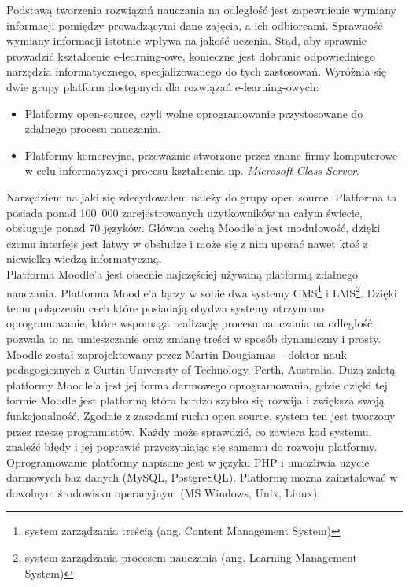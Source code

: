 \hspace{1cm}Podstawą tworzenia rozwiązań nauczania na odległość jest zapewnienie wymiany informacji pomiędzy prowadzącymi dane zajęcia, a ich odbiorcami. Sprawność wymiany informacji istotnie wpływa na jakość uczenia. Stąd, aby sprawnie prowadzić kształcenie e-learning-owe, konieczne jest dobranie odpowiedniego narzędzia informatycznego, specjalizowanego do tych zastosowań. Wyróżnia się dwie grupy platform dostępnych dla rozwiązań e-learning-owych:
	\begin{itemize}
		\item Platformy open-source, czyli wolne oprogramowanie przystosowane do zdalnego procesu nauczania.
		\item Platformy komercyjne, przeważnie stworzone przez znane firmy komputerowe w celu informatyzacji procesu kształcenia np. \textit{Microsoft Class Server}.
	\end{itemize}
Narzędziem na jaki się zdecydowałem należy do grupy open source. Platforma ta posiada ponad 100~000 zarejestrowanych użytkowników na całym świecie, obsługuje ponad 70 języków. Główna cechą Moodle'a jest modułowość, dzięki czemu interfejs jest łatwy w obsłudze i może się z nim uporać nawet ktoś z niewielką wiedzą informatyczną.\\
Platforma Moodle'a jest obecnie najczęściej używaną platformą zdalnego nauczania. Platforma Moodle'a łączy w sobie dwa systemy CMS\footnote{system zarządzania treścią (ang. Content Management System)} i LMS\footnote{system zarządzania procesem nauczania (ang. Learning Management System)}. Dzięki temu połączeniu cech które posiadają obydwa systemy otrzymano oprogramowanie, które wspomaga realizację procesu nauczania na odległość, pozwala to na umieszczanie oraz zmianę treści w sposób dynamiczny i prosty. \\
\hspace{1cm}Moodle został zaprojektowany przez Martin Dougiamas – doktor nauk pedagogicznych z Curtin University of Technology, Perth, Australia. Dużą zaletą platformy Moodle'a jest jej forma darmowego oprogramowania, gdzie dzięki tej formie Moodle jest platformą która bardzo szybko się rozwija i zwiększa swoją funkcjonalność. Zgodnie z zasadami ruchu open source, system ten jest tworzony przez rzeszę programistów. Każdy może sprawdzić, co zawiera kod systemu, znaleźć błędy i jej poprawić przyczyniając się samemu do rozwoju platformy. Oprogramowanie platformy napisane jest w języku PHP i umożliwia użycie darmowych baz danych (MySQL, PostgreSQL). Platformę można zainstalować w dowolnym środowisku operacyjnym (MS Windows, Unix, Linux).\\
